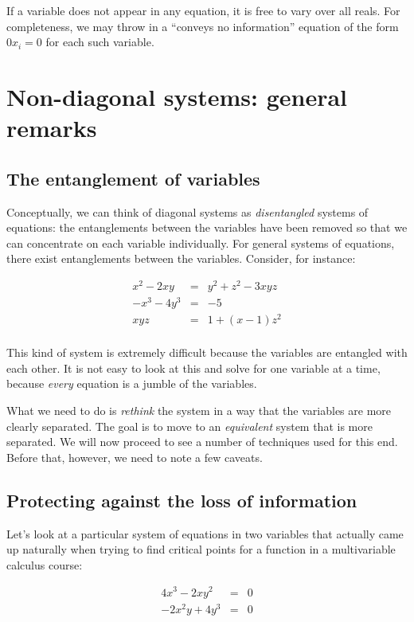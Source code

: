 \documentclass[10pt]{amsart}
\begin{document}
If a variable does not appear in any equation, it is free to vary over
all reals. For completeness, we may throw in a ``conveys no
information'' equation of the form $0x_i = 0$ for each such variable.

\section{Non-diagonal systems: general remarks}

\subsection{The entanglement of variables}

Conceptually, we can think of diagonal systems as {\em disentangled}
systems of equations: the entanglements between the variables have
been removed so that we can concentrate on each variable
individually. For general systems of equations, there exist
entanglements between the variables. Consider, for instance:

\begin{eqnarray*}
  x^2 - 2xy & = & y^2 + z^2 - 3xyz\\
  -x^3 - 4y^3 & = & -5\\
  xyz & = & 1 + (x - 1)z^2\\
\end{eqnarray*}

This kind of system is extremely difficult because the variables are
entangled with each other. It is not easy to look at this and solve
for one variable at a time, because {\em every} equation is a jumble
of the variables.

What we need to do is {\em rethink} the system in a way that the
variables are more clearly separated. The goal is to move to an {\em
  equivalent} system that is more separated. We will now proceed to
see a number of techniques used for this end. Before that, however, we
need to note a few caveats.

\subsection{Protecting against the loss of information}

Let's look at a particular system of equations in two variables that
actually came up naturally when trying to find critical points for a
function in a multivariable calculus course:

\begin{eqnarray*}
  4x^3 - 2xy^2 & = & 0\\
  -2x^2y + 4y^3 & = &0\\
\end{eqnarray*}
\end{document}
